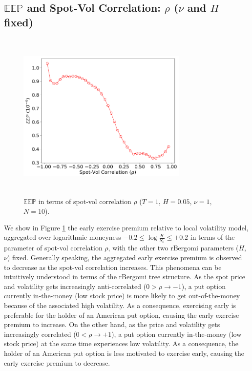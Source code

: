\documentclass[12pt]{article}
\numberwithin{equation}{section}
\begin{document}
\subsection{$\mathbb{EEP}$ and Spot-Vol Correlation: $\rho$ ($\nu$ and $H$ fixed)}
\begin{figure}[!htb]
\begin{center}
  \includegraphics[width=0.75\textwidth, height=8.5cm]{eep_rho}
\caption{$\mathbb{EEP}$ in terms of spot-vol correlation $\rho$ ($T=1$, $H=0.05$, $\nu=1$, $N=10$).}
\label{fig:eep_rho}
\end{center}
\end{figure}
We show in Figure \ref{fig:eep_rho} the early exercise premium relative to local volatility model, aggregated over logarithmic moneyness $-0.2\le\log \frac{K}{S_0}\le +0.2$ in terms of the parameter of spot-vol correlation $\rho$, with the other two rBergomi parameters ($H$, $\nu$) fixed. Generally speaking, the aggregated early exercise premium is observed to decrease as the spot-vol correlation increases. This phenomena can be intuitively understood in terms of the rBergomi tree structure. As the spot price and volatility gets increasingly anti-correlated ($0>\rho\rightarrow -1$), a put option currently in-the-money (low stock price) is more likely to get out-of-the-money because of the associated high volatility. As a consequence, exercising early is preferable for the holder of an American put option, causing the early exercise premium to increase. On the other hand, as the price and volatility gets increasingly correlated ($0<\rho\rightarrow +1$), a put option currently in-the-money (low stock price) at the same time experiences low volatility. As a consequence, the holder of an American put option is less motivated to exercise early, causing the early exercise premium to decrease.
\end{document}
